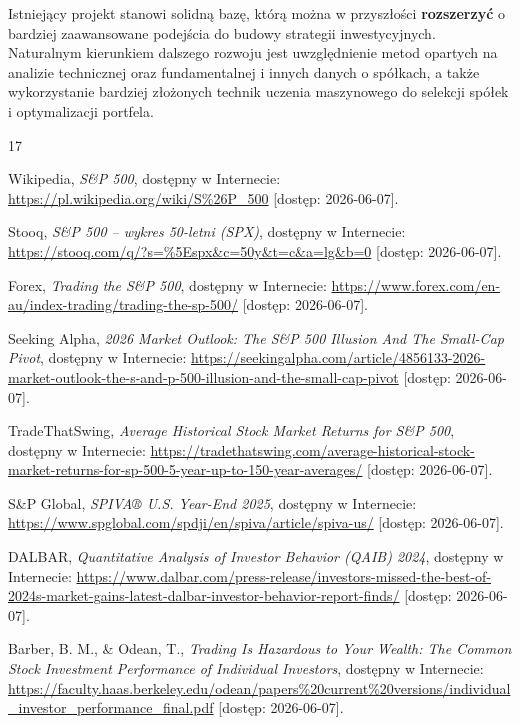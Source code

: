 \documentclass[12pt, a4paper]{article}
\begin{document}
Istniejący projekt stanowi solidną bazę, którą można w przyszłości \textbf{rozszerzyć} o bardziej zaawansowane podejścia do budowy strategii inwestycyjnych. Naturalnym kierunkiem dalszego rozwoju jest uwzględnienie metod opartych na analizie technicznej oraz fundamentalnej i innych danych o spółkach, a także wykorzystanie bardziej złożonych technik uczenia maszynowego do selekcji spółek i optymalizacji portfela.

\begin{thebibliography}{17}

Wikipedia, \textit{S\&P 500}, dostępny w Internecie: \url{https://pl.wikipedia.org/wiki/S\%26P_500} [dostęp: 2026-06-07].

Stooq, \textit{S\&P 500 – wykres 50-letni (SPX)}, dostępny w Internecie: \url{https://stooq.com/q/?s=\%5Espx&c=50y&t=c&a=lg&b=0} [dostęp: 2026-06-07].

Forex, \textit{Trading the S\&P 500}, dostępny w Internecie: \url{https://www.forex.com/en-au/index-trading/trading-the-sp-500/} [dostęp: 2026-06-07].

Seeking Alpha, \textit{2026 Market Outlook: The S\&P 500 Illusion And The Small-Cap Pivot}, dostępny w Internecie: \url{https://seekingalpha.com/article/4856133-2026-market-outlook-the-s-and-p-500-illusion-and-the-small-cap-pivot} [dostęp: 2026-06-07].

TradeThatSwing, \textit{Average Historical Stock Market Returns for S\&P 500}, dostępny w Internecie: \url{https://tradethatswing.com/average-historical-stock-market-returns-for-sp-500-5-year-up-to-150-year-averages/} [dostęp: 2026-06-07].

S\&P Global, \textit{SPIVA® U.S. Year-End 2025}, dostępny w Internecie: \url{https://www.spglobal.com/spdji/en/spiva/article/spiva-us/} [dostęp: 2026-06-07].

DALBAR, \textit{Quantitative Analysis of Investor Behavior (QAIB) 2024}, dostępny w Internecie: \url{https://www.dalbar.com/press-release/investors-missed-the-best-of-2024s-market-gains-latest-dalbar-investor-behavior-report-finds/} [dostęp: 2026-06-07].

Barber, B. M., \& Odean, T., \textit{Trading Is Hazardous to Your Wealth: The Common Stock Investment Performance of Individual Investors}, dostępny w Internecie: \url{https://faculty.haas.berkeley.edu/odean/papers\%20current\%20versions/individual_investor_performance_final.pdf} [dostęp: 2026-06-07].


\end{thebibliography}
\end{document}

